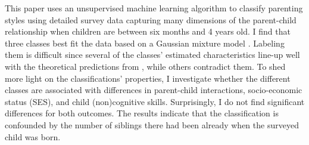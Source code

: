 This paper uses an unsupervised machine learning algorithm to classify parenting styles using detailed survey data capturing many dimensions of the parent-child relationship when children are between six months and 4 years old. I find that three classes best fit the data based on a Gaussian mixture model \parencite[e.g.][]{hastieElementsStatisticalLearning2009}. Labeling them is difficult since several of the classes' estimated characteristics line-up well with the theoretical predictions from \textcite{doepkeParentingStyleAltruism2017}, while others contradict them.
To shed more light on the classifications' properties, I investigate whether the different classes are associated with differences in parent-child interactions, socio-economic status (SES), and child (non)cognitive skills. Surprisingly, I do not find significant differences for both outcomes. The results indicate that the classification is confounded by the number of siblings there had been already when the surveyed child was born.



